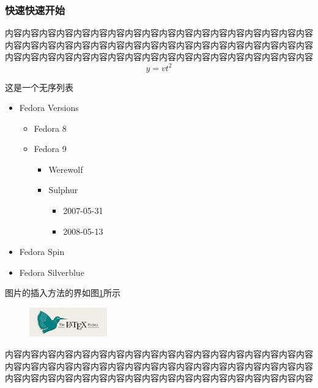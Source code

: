 \documentclass{bjfu}
\begin{document}
\subsubsection{快速快速开始}

内容内容内容内容内容内容内容内容内容内容内容内容内容内容内容内容内容内容内容内容内容内容内容内容内容内容内容内容内容内容内容内容内容内容内容内容内容内容内容内容内容内容内容内容内容内容内容内容内容内容内容内容内容内容
\begin{equation}
    y=vt^2
\end{equation}


这是一个无序列表
\begin{itemize}
    \item Fedora Versions
    \begin{itemize}
        \item Fedora 8
        \item Fedora 9
        \begin{itemize}
            \item Werewolf
            \item Sulphur
            \begin{itemize}
                \item 2007-05-31
                \item 2008-05-13
            \end{itemize}
        \end{itemize}
    \end{itemize}
    \item Fedora Spin
    \item Fedora Silverblue
\end{itemize}

图片的插入方法的界如图\ref{Fig:test}所示
\begin{figure}[htbp] %
    \centering %
    \includegraphics[width=0.3\textwidth]{images/test.png} %
    \label{Fig:test} %
\end{figure}

内容内容内容内容内容内容内容内容内容内容内容内容内容内容内容内容内容内容内容内容内容内容内容内容内容内容内容内容内容内容内容内容内容内容内容内容内容内容内容内容内容内容内容内容内容内容内容内容内容内容内容内容内容内容
\end{document}
